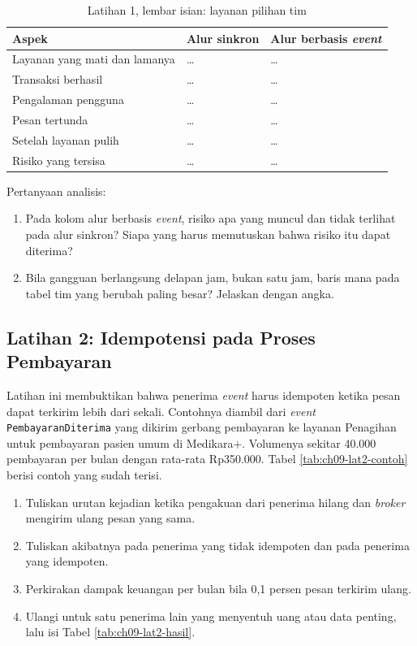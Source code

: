 \begin{table}[!htb]
  \centering
  \caption{Latihan 1, lembar isian: layanan pilihan tim}
  \label{tab:ch09-lat1-hasil}
  \footnotesize
  \begin{tabularx}{\textwidth}{>{\raggedright\arraybackslash}p{2.6cm} >{\raggedright\arraybackslash}X >{\raggedright\arraybackslash}X}
    \hline
    \textbf{Aspek} & \textbf{Alur sinkron} & \textbf{Alur berbasis \textit{event}} \\ \hline
    Layanan yang mati dan lamanya & \dots & \dots \\ \hline
    Transaksi berhasil & \dots & \dots \\ \hline
    Pengalaman pengguna & \dots & \dots \\ \hline
    Pesan tertunda & \dots & \dots \\ \hline
    Setelah layanan pulih & \dots & \dots \\ \hline
    Risiko yang tersisa & \dots & \dots \\ \hline
  \end{tabularx}
\end{table}

Pertanyaan analisis:
\begin{enumerate}
  \item Pada kolom alur berbasis \textit{event}, risiko apa yang muncul dan tidak terlihat pada alur
        sinkron? Siapa yang harus memutuskan bahwa risiko itu dapat diterima?
  \item Bila gangguan berlangsung delapan jam, bukan satu jam, baris mana pada tabel tim yang
        berubah paling besar? Jelaskan dengan angka.
\end{enumerate}

\subsection*{Latihan 2: Idempotensi pada Proses Pembayaran}

Latihan ini membuktikan bahwa penerima \textit{event} harus idempoten ketika pesan dapat terkirim
lebih dari sekali. Contohnya diambil dari \textit{event} \texttt{PembayaranDiterima} yang dikirim
gerbang pembayaran ke layanan Penagihan untuk pembayaran pasien umum di Medikara+. Volumenya
sekitar 40.000 pembayaran per bulan dengan rata-rata Rp350.000. Tabel \ref{tab:ch09-lat2-contoh}
berisi contoh yang sudah terisi.

\begin{enumerate}
  \item Tuliskan urutan kejadian ketika pengakuan dari penerima hilang dan \textit{broker} mengirim
        ulang pesan yang sama.
  \item Tuliskan akibatnya pada penerima yang tidak idempoten dan pada penerima yang idempoten.
  \item Perkirakan dampak keuangan per bulan bila 0,1 persen pesan terkirim ulang.
  \item Ulangi untuk satu penerima lain yang menyentuh uang atau data penting, lalu isi Tabel
        \ref{tab:ch09-lat2-hasil}.
\end{enumerate}

